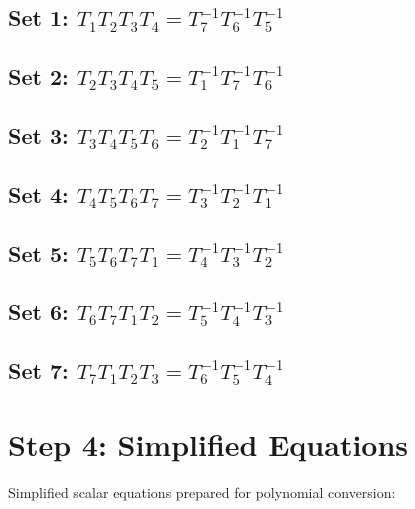 \documentclass[12pt, a4paper]{article}
\begin{document}
\subsection*{Set 1: $T_{1}T_{2}T_{3}T_{4} = T_{7}^{-1}T_{6}^{-1}T_{5}^{-1}$}
\subsection*{Set 2: $T_{2}T_{3}T_{4}T_{5} = T_{1}^{-1}T_{7}^{-1}T_{6}^{-1}$}
\subsection*{Set 3: $T_{3}T_{4}T_{5}T_{6} = T_{2}^{-1}T_{1}^{-1}T_{7}^{-1}$}
\subsection*{Set 4: $T_{4}T_{5}T_{6}T_{7} = T_{3}^{-1}T_{2}^{-1}T_{1}^{-1}$}
\subsection*{Set 5: $T_{5}T_{6}T_{7}T_{1} = T_{4}^{-1}T_{3}^{-1}T_{2}^{-1}$}
\subsection*{Set 6: $T_{6}T_{7}T_{1}T_{2} = T_{5}^{-1}T_{4}^{-1}T_{3}^{-1}$}
\subsection*{Set 7: $T_{7}T_{1}T_{2}T_{3} = T_{6}^{-1}T_{5}^{-1}T_{4}^{-1}$}


\section{Step 4: Simplified Equations}
Simplified scalar equations prepared for polynomial conversion:
\end{document}
